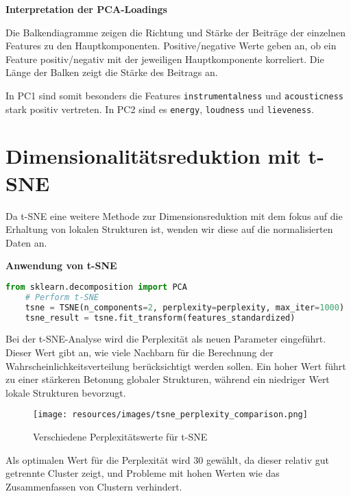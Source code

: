 \textbf{Interpretation der PCA-Loadings}

Die Balkendiagramme zeigen die Richtung und Stärke der Beiträge der einzelnen Features zu den Hauptkomponenten. Positive/negative Werte geben an, ob ein Feature positiv/negativ mit der jeweiligen Hauptkomponente korreliert. Die Länge der Balken zeigt die Stärke des Beitrags an.

In PC1 sind somit besonders die Features \texttt{instrumentalness} und \texttt{acousticness} stark positiv vertreten. In PC2 sind es \texttt{energy}, \texttt{loudness} und \texttt{lieveness}.









\section{Dimensionalitätsreduktion mit t-SNE}

Da t-SNE eine weitere Methode zur Dimensionsreduktion mit dem fokus auf die Erhaltung von lokalen Strukturen ist, wenden wir diese auf die normalisierten Daten an.

\textbf{Anwendung von t-SNE}

\begin{lstlisting}[language=python, caption={t-SNE-Analyse der Musikdaten}]
    from sklearn.decomposition import PCA
    # Perform t-SNE
    tsne = TSNE(n_components=2, perplexity=perplexity, max_iter=1000)
    tsne_result = tsne.fit_transform(features_standardized)
\end{lstlisting}

Bei der t-SNE-Analyse wird die Perplexität als neuen Parameter eingeführt. Dieser Wert gibt an, wie viele Nachbarn für die Berechnung der Wahrscheinlichkeitsverteilung berücksichtigt werden sollen. Ein hoher Wert führt zu einer stärkeren Betonung globaler Strukturen, während ein niedriger Wert lokale Strukturen bevorzugt.

\begin{figure}[H]
    \centering
    \texttt{[image: resources/images/tsne\_perplexity\_comparison.png]}
    \caption{Verschiedene Perplexitätswerte für t-SNE}
\end{figure}
Als optimalen Wert für die Perplexität wird 30 gewählt, da dieser relativ gut getrennte Cluster zeigt, und Probleme mit hohen Werten wie das Zusammenfassen von Clustern verhindert.